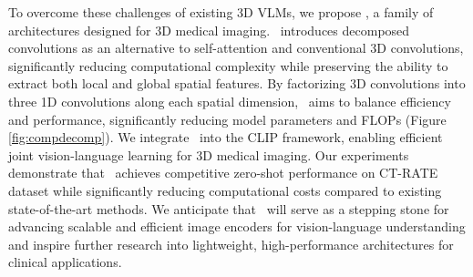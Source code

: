 To overcome these challenges of existing 3D VLMs, we propose \dc, a family of architectures designed for 3D medical imaging. \dc\ introduces decomposed convolutions as an alternative to self-attention and conventional 3D convolutions, significantly reducing computational complexity while preserving the ability to extract both local and global spatial features. By factorizing 3D convolutions into three 1D convolutions along each spatial dimension, \dc\ aims to balance efficiency and performance, significantly reducing model parameters and FLOPs (Figure \ref{fig:compdecomp}). We integrate \dc\ into the CLIP framework, enabling efficient joint vision-language learning for 3D medical imaging. Our experiments demonstrate that \dc\ achieves competitive zero-shot performance on CT-RATE dataset while significantly reducing computational costs compared to existing state-of-the-art methods. We anticipate that \dc\ will serve as a stepping stone for advancing scalable and efficient image encoders for vision-language understanding and inspire further research into lightweight, high-performance architectures for clinical applications.




